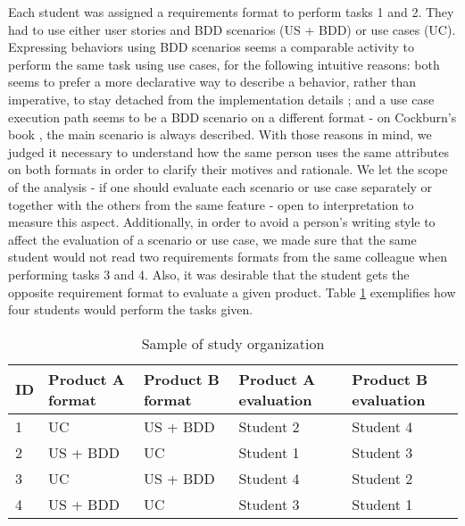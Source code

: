 Each student was assigned a requirements format to perform tasks 1 and 2. They had to use either user stories and BDD scenarios (US + BDD) or use cases (UC). Expressing behaviors using BDD scenarios seems a comparable activity to perform the same task using use cases, for the following intuitive reasons: both seems to prefer a more declarative way to describe a behavior, rather than imperative, to stay detached from the implementation details \cite{Cockburn_2000} \cite{Smart_2014}; and a use case execution path seems to be a BDD scenario on a different format - on Cockburn's book \cite{Cockburn_2000}, the main scenario is always described. With those reasons in mind, we judged it necessary to understand how the same person uses the same attributes on both formats in order to clarify their motives and rationale. We let the scope of the analysis - if one should evaluate each scenario or use case separately or together with the others from the same feature - open to interpretation to measure this aspect. Additionally, in order to avoid a person's writing style to affect the evaluation of a scenario or use case, we made sure that the same student would not read two requirements formats from the same colleague when performing tasks 3 and 4. Also, it was desirable that the student gets the opposite requirement format to evaluate a given product. Table \ref{table:study_organization} exemplifies how four students would perform the tasks given. 

\begin{table}[!t]
\renewcommand{\arraystretch}{1}
\caption{Sample of study organization}
\label{table:study_organization}
\centering
\begin{tabular}{|m{0.5cm}|m{1.2cm}|m{1.2cm}|m{1.2cm}|m{1.2cm}|}
\hline
ID & Product A format & Product B format & Product A evaluation & Product B evaluation\\
\hline
1 & UC & US + BDD & Student 2 & Student 4\\
\hline
2 & US + BDD & UC & Student 1 & Student 3\\
\hline
3 & UC & US + BDD & Student 4 & Student 2\\
\hline
4 & US + BDD & UC & Student 3 & Student 1\\
\hline
\end{tabular}
\end{table}

